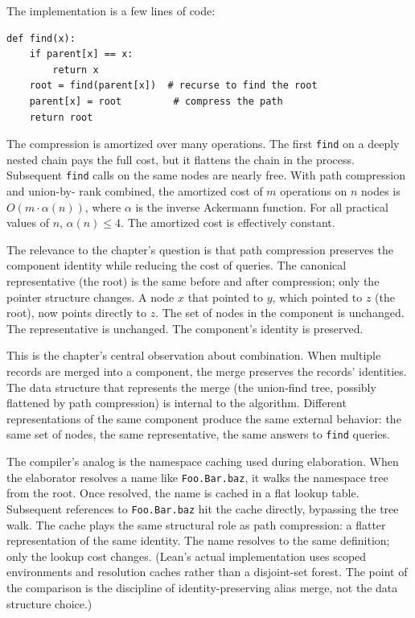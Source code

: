 The implementation is a few lines of code:
\begin{verbatim}
def find(x):
    if parent[x] == x:
        return x
    root = find(parent[x])  # recurse to find the root
    parent[x] = root         # compress the path
    return root
\end{verbatim}

The compression is amortized over many operations. The first
\texttt{find} on a deeply nested chain pays the full cost, but it
flattens the chain in the process. Subsequent \texttt{find} calls on
the same nodes are nearly free. With path compression and union-by-
rank combined, the amortized cost of $m$ operations on $n$ nodes is
$O(m \cdot \alpha(n))$, where $\alpha$ is the inverse Ackermann
function. For all practical values of $n$, $\alpha(n) \le 4$. The
amortized cost is effectively constant.

The relevance to the chapter's question is that path compression
preserves the component identity while reducing the cost of
queries. The canonical representative (the root) is the same before
and after compression; only the pointer structure changes. A node $x$
that pointed to $y$, which pointed to $z$ (the root), now points
directly to $z$. The set of nodes in the component is unchanged. The
representative is unchanged. The component's identity is preserved.

This is the chapter's central observation about combination. When
multiple records are merged into a component, the merge preserves
the records' identities. The data structure that represents the merge
(the union-find tree, possibly flattened by path compression) is
internal to the algorithm. Different representations of the same
component produce the same external behavior: the same set of nodes,
the same representative, the same answers to \texttt{find} queries.

The compiler's analog is the namespace caching used during
elaboration. When the elaborator resolves a name like
\texttt{Foo.Bar.baz}, it walks the namespace tree from the root.
Once resolved, the name is cached in a flat lookup table. Subsequent
references to \texttt{Foo.Bar.baz} hit the cache directly,
bypassing the tree walk. The cache plays the same structural role
as path compression: a flatter representation of the same
identity. The name resolves to the same definition; only the
lookup cost changes. (Lean's actual implementation uses scoped
environments and resolution caches rather than a disjoint-set
forest. The point of the comparison is the discipline of
identity-preserving alias merge, not the data structure choice.)


